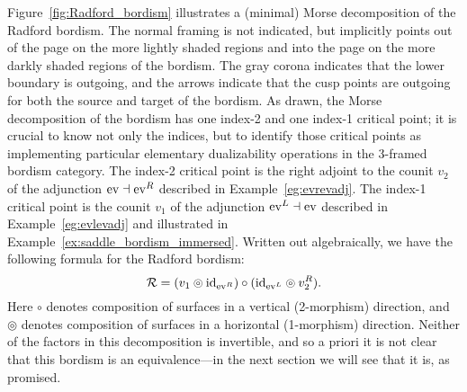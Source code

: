 \documentclass{amsart}
\begin{document}
Figure~\ref{fig:Radford_bordism} illustrates a (minimal) Morse decomposition of the Radford bordism.  The normal framing is not indicated, but implicitly points out of the page on the more lightly shaded regions and into the page on the more darkly shaded regions of the bordism.  The gray corona indicates that the lower boundary is outgoing, and the arrows indicate that the cusp points are outgoing for both the source and target of the bordism.  As drawn, the Morse decomposition of the bordism has one index-2 and one index-1 critical point; it is crucial to know not only the indices, but to identify those critical points as implementing particular elementary dualizability operations in the 3-framed bordism category.  The index-2 critical point is the right adjoint to the counit $v_2$ of the adjunction $\mathrm{ev} \dashv \mathrm{ev}^R$ described in Example~\ref{eg:evrevadj}.  The index-1 critical point is the counit $v_1$ of the adjunction $\mathrm{ev}^L \dashv \mathrm{ev}$ described in Example~\ref{eg:evlevadj} and illustrated in Example~\ref{ex:saddle_bordism_immersed}.  Written out algebraically, we have the following formula for the Radford bordism:
\begin{equation*}
	\mathcal R = (v_1 \circledcirc \mathrm{id}_{\mathrm{ev}^R})\circ (\mathrm{id}_{\mathrm{ev}^L} \circledcirc v_2^R).
\end{equation*}
Here $\circ$ denotes composition of surfaces in a vertical (2-morphism) direction, and $\circledcirc$ denotes composition of surfaces in a horizontal (1-morphism) direction.  Neither of the factors in this decomposition is invertible, and so a priori it is not clear that this bordism is an equivalence---in the next section we will see that it is, as promised.
\end{document}
